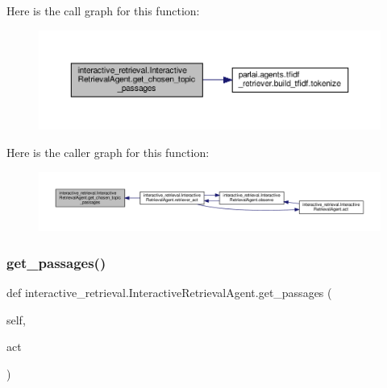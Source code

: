Here is the call graph for this function\+:
\nopagebreak
\begin{figure}[H]
\begin{center}
\leavevmode
\includegraphics[width=350pt]{classinteractive__retrieval_1_1InteractiveRetrievalAgent_a89ffcbffdda3d20c82ef7ee65ab63461_cgraph}
\end{center}
\end{figure}
Here is the caller graph for this function\+:
\nopagebreak
\begin{figure}[H]
\begin{center}
\leavevmode
\includegraphics[width=350pt]{classinteractive__retrieval_1_1InteractiveRetrievalAgent_a89ffcbffdda3d20c82ef7ee65ab63461_icgraph}
\end{center}
\end{figure}
\mbox{\label{classinteractive__retrieval_1_1InteractiveRetrievalAgent_acee2bc62b6109f28c06b82efb816eee3}} 
\subsubsection{\texorpdfstring{get\+\_\+passages()}{get\_passages()}}
{\footnotesize\ttfamily def interactive\+\_\+retrieval.\+Interactive\+Retrieval\+Agent.\+get\+\_\+passages (\begin{DoxyParamCaption}\item[{}]{self,  }\item[{}]{act }\end{DoxyParamCaption})}

